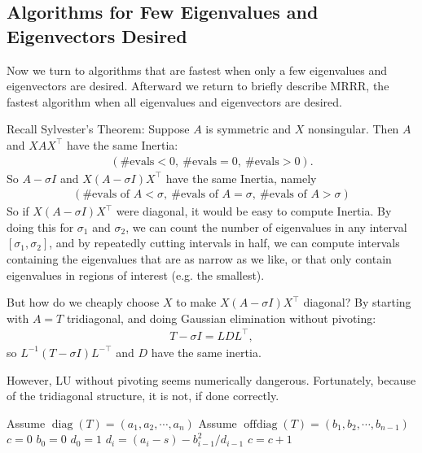 \documentclass[11pt]{article}
\numberwithin{equation}{section}
\begin{document}
\subsection{Algorithms for Few Eigenvalues and Eigenvectors Desired}
Now we turn to algorithms that are fastest when only a few eigenvalues and eigenvectors are desired. Afterward we return to briefly describe MRRR, 
the fastest algorithm when all eigenvalues and eigenvectors are desired.

Recall Sylvester's Theorem: Suppose $A$ is symmetric and $X$ nonsingular.
Then $A$ and $X A X^{\top}$ have the same Inertia: \begin{align*}
    (\#\mathrm{evals}<0, \ \#\mathrm{evals}=0, \ \#\mathrm{evals}>0).
\end{align*}
So $A - \sigma I$ and $X(A-\sigma I)X^\top$ have the same Inertia, namely \begin{align*}
    (\#\mathrm{evals} \text{ of }A < \sigma,\ \#\mathrm{evals} \text{ of }A  = \sigma,\ \#\mathrm{evals} \text{ of }A > \sigma)
\end{align*}
So if $X(A-\sigma I)X^\top$ were diagonal, it would be easy to compute Inertia. By doing this for $\sigma_1$ and $\sigma_2$, 
we can count the number of eigenvalues in any interval $[\sigma_1 , \sigma_2]$, and by repeatedly cutting intervals in half, 
we can compute intervals containing the eigenvalues that are as narrow as we like, or that only contain eigenvalues in regions of interest (e.g. the smallest). 

But how do we cheaply choose $X$ to make $X(A-\sigma I)X^\top$ diagonal? By starting with $A = T$ tridiagonal, and doing Gaussian elimination without pivoting: 
\begin{align*}
    T - \sigma I = LDL^\top ,
\end{align*}
so $L^{-1}(T - \sigma I)L^{-\top}$ and $D$ have the same inertia.

However, LU without pivoting seems numerically dangerous. Fortunately, because of the tridiagonal structure, it is not, if done correctly.

\begin{algorithmfrm}
    \begin{algorithmic}
        \State Assume $\operatorname{diag}(T) = (a_1, a_2, \cdots, a_n)$
        \State Assume $\operatorname{offdiag}(T) = (b_1, b_2, \cdots, b_{n-1})$
        \State $c = 0$
        \State $b_0 = 0$
        \State $d_0 = 1$
            \State $d_i = (a_i - s) - b_{i-1}^2/d_{i-1}$
                \State $c=c+1$
            \EndIf
        \EndFor
    \end{algorithmic}
\end{algorithmfrm}
\end{document}
